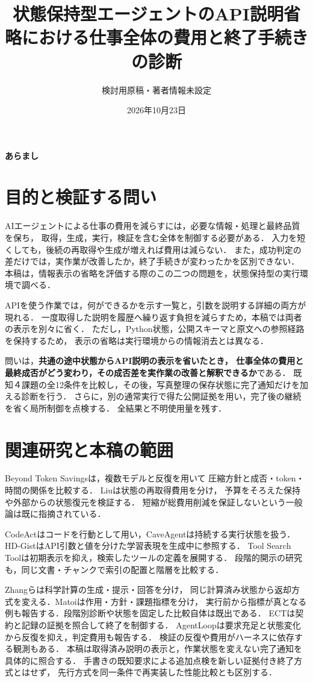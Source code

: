 \documentclass[uplatex,a4paper,twocolumn,10pt]{jsarticle}
\title{状態保持型エージェントのAPI説明省略における\newline 仕事全体の費用と終了手続きの診断}
\author{検討用原稿・著者情報未設定}
\date{2026年10月23日}
\begin{document}
\raggedbottom
\maketitle
\noindent\textbf{あらまし}\quad


\section{目的と検証する問い}
AIエージェントによる仕事の費用を減らすには，必要な情報・処理と最終品質を保ち，
取得，生成，実行，検証を含む全体を制御する必要がある．
入力を短くしても，後続の再取得や生成が増えれば費用は減らない\cite{beyond,interaction}．
また，成功判定の差だけでは，実作業が改善したか，終了手続きが変わったかを区別できない．
本稿は，情報表示の省略を評価する際のこの二つの問題を，状態保持型の実行環境で調べる．

APIを使う作業では，何ができるかを示す一覧と，引数を説明する詳細の両方が現れる．
一度取得した説明を履歴へ繰り返す負担を減らすため，本稿では両者の表示を別々に省く．
ただし，Python状態，公開スキーマと原文への参照経路を保持するため，
表示の省略は実行環境からの情報消去とは異なる．

問いは，\textbf{共通の途中状態からAPI説明の表示を省いたとき，
仕事全体の費用と最終成否がどう変わり，その成否差を実作業の改善と解釈できるか}である．
既知４課題の全12条件を比較し，その後，写真整理の保存状態に完了通知だけを加える診断を行う．
さらに，別の通常実行で得た公開証拠を用い，完了後の継続を省く局所制御を点検する．
全結果と不明使用量を残す．

\section{関連研究と本稿の範囲}
Beyond Token Savings\cite{beyond}は，複数モデルと反復を用いて
圧縮方針と成否・token・時間の関係を比較する．
Liu\cite{interaction}は状態の再取得費用を分け，
予算をそろえた保持や外部からの状態復元を検証する．
短縮が総費用削減を保証しないという一般論は既に指摘されている．

CodeAct\cite{codeact}はコードを行動として用い，CaveAgent\cite{cave}は持続する実行状態を扱う．
HD-Gist\cite{hdgist}はAPI引数と値を分けた学習表現を生成中に参照する．
Tool Search Tool\cite{toolsearch}は初期表示を抑え，検索したツールの定義を展開する．
段階的開示の研究\cite{disclosure}も，同じ文書・チャンクで索引の配置と階層を比較する．

Zhangら\cite{evidence}は科学計算の生成・提示・回答を分け，
同じ計算済み状態から返却方式を変える．Matoi\cite{matoi}は作用・方針・課題指標を分け，
実行前から指標が真となる例も報告する．段階別診断や状態を固定した比較自体は既出である．
ECT\cite{ect}は契約と記録の証拠を照合して終了を制御する．
AgentLoop\cite{agentloop}は要求充足と状態変化から反復を抑え，判定費用も報告する．
検証の反復や費用がハーネスに依存する観測もある\cite{waste}．
本稿は取得済み説明の表示と，作業状態を変えない完了通知を具体的に照合する．
手書きの既知要求による追加点検を新しい証拠付き終了方式とはせず，
先行方式を同一条件で再実装した性能比較とも区別する．
\end{document}
